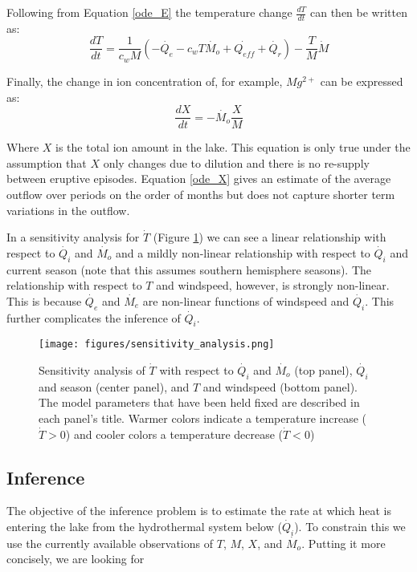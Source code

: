 \documentclass{bmc_template/bmcart}
\begin{document}
Following from Equation \ref{ode_E} the temperature change $\frac{dT}{dt}$ can then be written as:
\begin{equation}\label{ode_T}
	\frac{dT}{dt}=\frac{1}{c_wM}\left(-\dot{Q_e} - c_wT\dot{M_o} + \dot{Q_{eff}} + \dot{Q_r}\right )
	-\frac{T}{M}\dot{M}
\end{equation}

Finally, the change in ion concentration of, for example, $Mg^{2+}$ can be expressed as:
\begin{equation}\label{ode_X}
	\frac{dX}{dt}=-\dot{M_o}\frac{X}{M}
\end{equation}

Where $X$ is the total ion amount in the lake. This equation is only true under
the assumption that $X$ only changes due to dilution and there is no re-supply
between eruptive episodes. Equation \ref{ode_X} gives an estimate of the average
outflow over periods on the order of months but does not capture shorter term
variations in the outflow.

In a sensitivity analysis for $\dot{T}$ (Figure \ref{sens}) we can see a linear
relationship with respect to $\dot{Q_i}$ and $\dot{M_o}$ and a mildly
non-linear relationship with respect to $\dot{Q_i}$ and current season
(note that this assumes southern hemisphere seasons). The relationship with respect
to $T$ and windspeed, however, is strongly non-linear. This is because $\dot{Q_e}$
and $\dot{M_e}$ are non-linear functions of windspeed and $\dot{Q_i}$. This further 
complicates the inference of $\dot{Q_i}$.

\begin{figure}
    \texttt{[image: figures/sensitivity\_analysis.png]}  
    \caption{Sensitivity analysis of $\dot{T}$ with respect to $\dot{Q_i}$ 
             and $\dot{M_o}$ (top panel), $\dot{Q_i}$ and season 
             (center panel), and $T$ and windspeed (bottom panel). The model
              parameters that have been held fixed are described in each 
              panel's title. Warmer colors indicate a temperature increase
              ($\dot{T} > 0$) and cooler colors a temperature decrease
              ($\dot{T} < 0$)}
      \label{sens}
\end{figure}
    

\subsection{Inference}\label{inf}

The objective of the inference problem is to estimate the rate at which heat
is entering the lake from the hydrothermal system below ($\dot{Q_i}$).
To constrain this we use the currently available observations of $T$, $M$,
$X$, and $\dot{M_o}$. Putting it more concisely, we are looking for 
\end{document}
